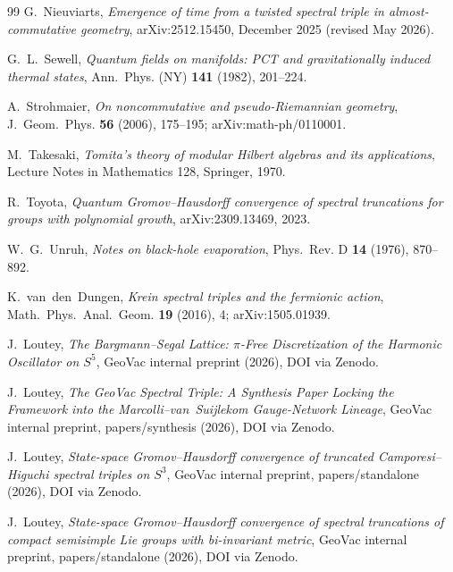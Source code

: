 \documentclass[11pt,a4paper]{article}
\theoremstyle{plain}
\theoremstyle{definition}
\begin{document}
\begin{thebibliography}{99}
G.~Nieuviarts,
\newblock \emph{Emergence of time from a twisted spectral triple
in almost-commutative geometry},
\newblock arXiv:2512.15450, December 2025 (revised May 2026).

G.~L.~Sewell,
\newblock \emph{Quantum fields on manifolds: PCT and gravitationally
induced thermal states},
\newblock Ann.~Phys. (NY) \textbf{141} (1982), 201--224.

A.~Strohmaier,
\newblock \emph{On noncommutative and pseudo-Riemannian geometry},
\newblock J.~Geom.~Phys. \textbf{56} (2006), 175--195;
\newblock arXiv:math-ph/0110001.

M.~Takesaki,
\newblock \emph{Tomita's theory of modular Hilbert algebras and its
applications},
\newblock Lecture Notes in Mathematics 128, Springer, 1970.

R.~Toyota,
\newblock \emph{Quantum Gromov--Hausdorff convergence of spectral
truncations for groups with polynomial growth},
\newblock arXiv:2309.13469, 2023.

W.~G.~Unruh,
\newblock \emph{Notes on black-hole evaporation},
\newblock Phys.~Rev. D \textbf{14} (1976), 870--892.

K.~van~den~Dungen,
\newblock \emph{Krein spectral triples and the fermionic action},
\newblock Math.~Phys.~Anal.~Geom. \textbf{19} (2016), 4;
\newblock arXiv:1505.01939.

J.~Loutey,
\newblock \emph{The Bargmann--Segal Lattice: $\pi$-Free Discretization
of the Harmonic Oscillator on $S^5$},
\newblock GeoVac internal preprint (2026), DOI via Zenodo.

J.~Loutey,
\newblock \emph{The GeoVac Spectral Triple: A Synthesis Paper Locking
the Framework into the Marcolli--van~Suijlekom Gauge-Network Lineage},
\newblock GeoVac internal preprint, papers/synthesis (2026),
DOI via Zenodo.

J.~Loutey,
\newblock \emph{State-space Gromov--Hausdorff convergence of
truncated Camporesi--Higuchi spectral triples on $S^3$},
\newblock GeoVac internal preprint, papers/standalone (2026),
DOI via Zenodo.

J.~Loutey,
\newblock \emph{State-space Gromov--Hausdorff convergence of spectral
truncations of compact semisimple Lie groups with bi-invariant metric},
\newblock GeoVac internal preprint, papers/standalone (2026),
DOI via Zenodo.


\end{thebibliography}
\end{document}
